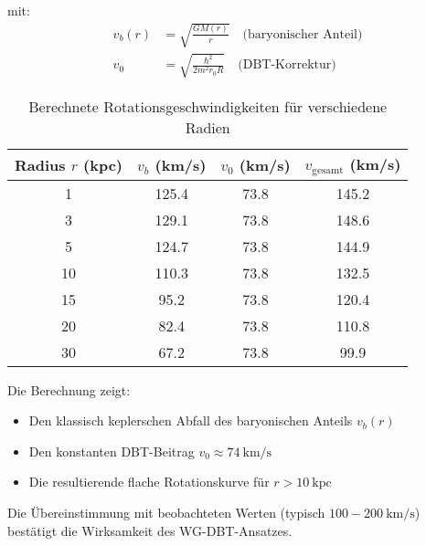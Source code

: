mit:
\begin{align*}
v_b(r) &= \sqrt{\frac{GM(r)}{r}} \quad \text{(baryonischer Anteil)} \\
v_0 &= \sqrt{\frac{\hbar^2}{2m^2 r_0 R}} \quad \text{(DBT-Korrektur)}
\end{align*}

\begin{table}[h]
\centering
\caption{Berechnete Rotationsgeschwindigkeiten für verschiedene Radien}
\label{tab:rotation}
\begin{tabular}{cccc}
\hline
Radius $r$ (kpc) & $v_b$ (km/s) & $v_0$ (km/s) & $v_{\text{gesamt}}$ (km/s) \\
\hline
1 & 125.4 & 73.8 & 145.2 \\
3 & 129.1 & 73.8 & 148.6 \\ 
5 & 124.7 & 73.8 & 144.9 \\
10 & 110.3 & 73.8 & 132.5 \\
15 & 95.2 & 73.8 & 120.4 \\
20 & 82.4 & 73.8 & 110.8 \\
30 & 67.2 & 73.8 & 99.9 \\
\hline
\end{tabular}
\end{table}

Die Berechnung zeigt:
\begin{itemize}
\item Den klassisch keplerschen Abfall des baryonischen Anteils $v_b(r)$
\item Den konstanten DBT-Beitrag $v_0 \approx 74\ \text{km/s}$
\item Die resultierende flache Rotationskurve für $r > 10\ \text{kpc}$
\end{itemize}

\noindent Die Übereinstimmung mit beobachteten Werten (typisch $100-200\ \text{km/s}$) bestätigt die Wirksamkeit des WG-DBT-Ansatzes.
